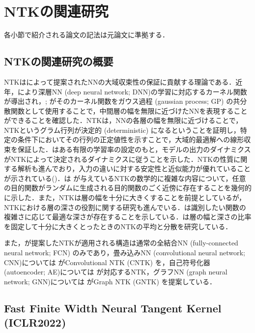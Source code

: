 \section{NTKの関連研究}
各小節で紹介される論文の記法は元論文に準拠する．

\subsection{NTKの関連研究の概要}
NTKは\citealp{jacot2018neural}によって提案されたNNの大域収束性の保証に貢献する理論である．近年，\citet{cho2009kernel}により深層NN (deep neural network; DNN)の学習に対応するカーネル関数が導出され，\citet{neal2012bayesian};  \citet{lee2018deep}がそのカーネル関数をガウス過程 (gaussian process; GP) の共分散関数として使用することで，中間層の幅を無限に近づけたNNを表現することができることを確認した．NTKは，NNの各層の幅を無限に近づけることで，NTKというグラム行列が決定的 (deterministic) になるということを証明し，特定の条件下においてその行列の正定値性を示すことで，大域的最適解への線形収束を保証した．\citet{lee2019wide}はある有限の学習率の設定のもと，モデルの出力のダイナミクスがNTKによって決定されるダイナミクスに従うことを示した．NTKの性質に関する解析も進んでおり，入力の違いに対する安定性と近似能力が優れていることが示されている(\citealp{bietti2019inductive})．\citet{amari2020any}は \citet{jacot2018neural}が与えているNTKの数学的に複雑な内容について，任意の目的関数がランダムに生成される目的関数のごく近傍に存在することを幾何的に示した．また，NTKは層の幅を十分に大きくすることを前提としているが，NTKにおける層の深さの役割に関する研究も進んでいる．\citet{yang2019fine}は識別したい関数の複雑さに応じて最適な深さが存在することを示している．\citet{hanin2019finite}は層の幅と深さの比率を固定して十分に大きくとったときのNTKの平均と分散を研究している．

また，\citet{jacot2018neural}が提案したNTKが適用される構造は通常の全結合NN (fully-connected neural network; FCN) のみであり，畳み込みNN (convolutional neural network; CNN)については \citet{Arora2019OnEC}がConvolutional NTK (CNTK) を，自己符号化器 (autoencoder; AE)については \citet{nguyen2019benefits}が対応するNTK，グラフNN (graph neural network; GNN)については \citet{du2019graph}がGraph NTK (GNTK) を提案している．

\subsection{Fast Finite Width Neural Tangent Kernel (ICLR2022)}

